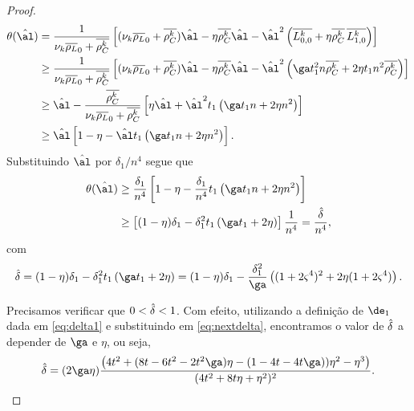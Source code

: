 \begin{proof}
	\begin{align}
		\theta(\nextal)%
						& = \dfrac{1}{\nuk \dbvec{\rho_L}_0 + \rhoCkb }\left[ (\nuk \dbvec{\rho_L}_0 + \rhoCkb )\nextal -  \eta\rhoCkb \nextal - \nextal^{2}\left(\dbvec{L_{0,0}^{k}} + \eta\rhoCkb \, \dbvec{L_{1,0}^{k}} \right) \right] \notag\\
						& \geq \dfrac{1}{\nuk \dbvec{\rho_L}_0 + \rhoCkb }\left[ (\nuk \dbvec{\rho_L}_0 + \rhoCkb )\nextal -  \eta\rhoCkb \nextal - \nextal^{2}\left(\ga t_{1}^{2} n\rhoCkb  + 2\eta t_1 n^{2}\rhoCkb  \right) \right]\notag\\
						& \geq \nextal - \dfrac{\rhoCkb }{\nuk \dbvec{\rho_L}_0 + \rhoCkb } \left[   \eta\nextal + \nextal^{2} t_{1}\left(\ga t_1 n + 2\eta  n^{2}  \right) \right]\notag\\
						& \geq \nextal \left[ 1 -  \eta - \nextal t_{1}\left(\ga t_1 n + 2\eta  n^{2}  \right) \right]. \notag
	\end{align}
Substituindo $\nextal$ por $\delta_{1}/n^{4}$ segue que  	
	\begin{align}
			\theta(\nextal)			& \geq \frac{\delta_{1}}{n^{4}} \left[ 1 -  \eta - \frac{\delta_{1}}{n^{4}}t_{1}\left(\ga t_1 n + 2\eta  n^{2}  \right) \right]\notag \\
						& \geq 	 \left[ (1 -  \eta)\delta_{1} - \delta_{1}^{2}t_{1}\left(\ga t_1  + 2\eta    \right) \right] \frac{1}{n^{4}}	
						 = \frac{\nextdel}{n^{4}},\label{eq:theta-nextalpha}		
		\end{align}
	com 	\begin{equation}
		\label{eq:nextdelta}
		\nextdel = 
	(1 -  \eta)\delta_{1} - \delta_{1}^{2}t_{1}\left(\ga t_{1}  + 2\eta    \right) = (1 -  \eta)\delta_{1} - \dfrac{\delta_{1}^{2}}{\ga}\left((1+2\bdxzstar^{4})^{2}  + 2\eta(1+2\bdxzstar^{4})    \right).
	\end{equation} 
	
	 Precisamos verificar que $0<\hat{\delta}<1$.
Com efeito, utilizando a definição de $\de_1$ dada em \eqref{eq:delta1} e substituindo em \eqref{eq:nextdelta}, encontramos o valor de $\hat{\delta}$ a depender de $\ga$ e $\eta$,  ou seja, 
	\begin{equation*}
		\nextdel = (2\ga\eta)\frac{\left(4 t^2 +(8t - 6t^2   -2t^2\ga) \eta - ( 1 - 4t    - 4t   \ga) ) \eta^2 - \eta^3\right)}{(4t^2 + 8t\eta + \eta^{2})^{2}}.
	\end{equation*}


\end{proof}
